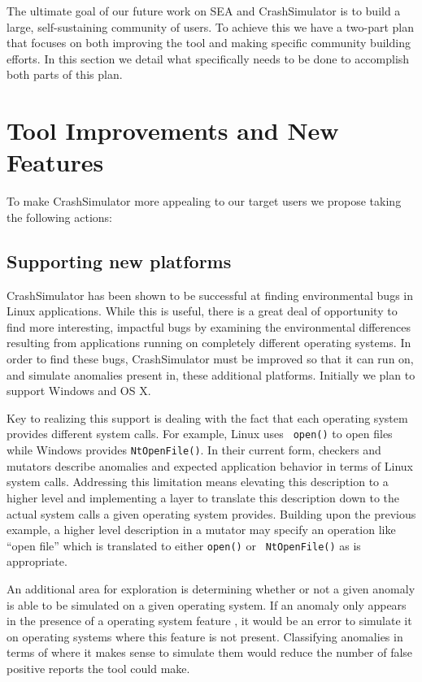 \documentclass[twocolumn]{article}
\begin{document}
The ultimate goal of our future work on SEA and CrashSimulator is to build
a large, self-sustaining community of users.  To achieve this we have a
two-part plan that focuses on both improving the tool and making specific
community building efforts.  In this section we detail what specifically
needs to be done to accomplish both parts of this plan.


\section{Tool Improvements and New Features}

To make CrashSimulator more appealing to our target users we propose taking
the following actions:


\subsection{Supporting new platforms}

CrashSimulator has been shown to be successful at finding
environmental bugs in Linux applications. While this is useful,
there is a great deal of opportunity to find more interesting, impactful
bugs by examining the environmental differences resulting from applications
running on completely different operating systems.
In order to find these
bugs, CrashSimulator must be improved so that it can run on, and simulate
anomalies present in, these additional platforms.  Initially we plan to
support Windows and OS X.

Key to realizing this support is dealing with the fact that each operating
system provides different system calls.  For example, Linux uses {\tt
open()} to open files while Windows provides {\tt NtOpenFile()}.  In their
current form, checkers and mutators describe anomalies and expected
application behavior in terms of Linux system calls.  Addressing this
limitation means elevating this description to a higher level and
implementing a layer to translate this description down to the actual
system calls a given operating system provides.  Building upon the previous
example, a higher level description in a mutator may specify an operation
like ``open file'' which is translated to either {\tt open()} or {\tt
NtOpenFile()} as is appropriate.

An additional area for exploration is determining whether or not a given
anomaly is able to be simulated on a given operating system.  If an anomaly
only appears in the presence of a operating system feature , it would be an
error to simulate it on operating systems where this feature is not
present.  Classifying anomalies in terms of where it makes sense to
simulate them would reduce the number of false positive reports the tool
could make.
\end{document}
